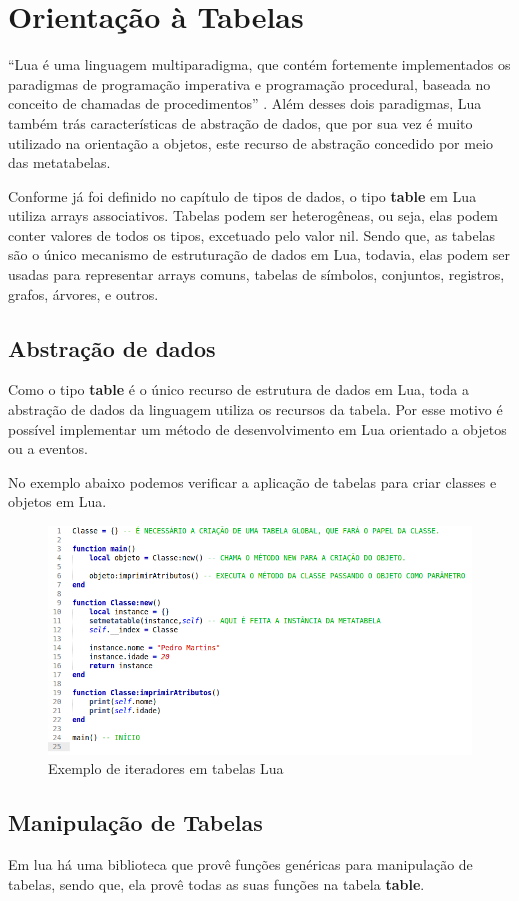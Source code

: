 \documentclass[
12pt, %
openright, %
oneside, %
a4paper, %
english, %
brazil, %
]{abntex2}
\begin{document}
\chapter{Orientação à Tabelas}
``Lua é uma linguagem multiparadigma, que contém fortemente implementados os paradigmas de programação imperativa e programação procedural, baseada no conceito de chamadas de procedimentos'' \cite{language_Lua}. Além desses dois paradigmas, Lua também trás características de abstração de dados, que por sua vez é muito utilizado na orientação a objetos, este recurso de abstração concedido por meio das metatabelas.

Conforme já foi definido no capítulo de tipos de dados, o tipo \textbf{table} em Lua utiliza arrays associativos. Tabelas podem ser heterogêneas, ou seja, elas podem conter valores de todos os tipos, excetuado pelo valor nil. Sendo que, as tabelas são o único mecanismo de estruturação de dados em Lua, todavia, elas podem ser usadas para representar arrays comuns, tabelas de símbolos, conjuntos, registros, grafos, árvores, e outros.

\section{Abstração de dados}
Como o tipo \textbf{table} é o único recurso de estrutura de dados em Lua, toda a abstração de dados da linguagem utiliza os recursos da tabela. Por esse motivo é possível implementar um método de desenvolvimento em Lua orientado a objetos ou a eventos.

No exemplo abaixo podemos verificar a aplicação de tabelas para criar classes e objetos em Lua.

\begin{figure}[H]
\centering
\includegraphics[width=0.8\linewidth]{imagens/OO.png}
\caption{Exemplo de iteradores em tabelas Lua}
\end{figure}

\section{Manipulação de Tabelas}
Em lua há uma biblioteca que provê funções genéricas para manipulação de tabelas, sendo que, ela provê todas as suas funções na tabela \textbf{table}.
\end{document}
